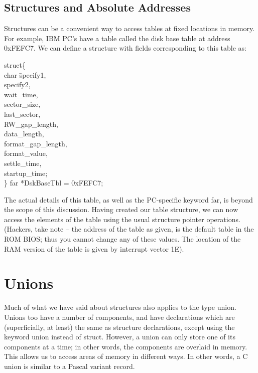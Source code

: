 \subsection{Structures and Absolute Addresses}
Structures can be a convenient way to access tables at fixed
locations in memory. For example, IBM PC's have a table called the
disk base table at address {\cd 0xFEFC7}. We can define a structure
with fields corresponding to this table as:
\begin{code}
struct\{ \+\\
	char \=specify1, \+\\
		specify2,	\\
		wait\_time,	\\
		sector\_size,	\\
		last\_sector,	\\
		RW\_gap\_length,	\\
		data\_length,	\\
		format\_gap\_length,	\\
		format\_value,	\\
		settle\_time,	\\
		startup\_time;	\-\-\\
\} far *DskBaseTbl = 0xFEFC7;
\end{code}
\noindent
The actual details of this table, as well as the PC-specific
keyword {\cd far}, is beyond the scope of this discussion. Having
created our table structure, we can now access the elements of the
table using the usual structure pointer operations. (Hackers, take
note -- the address of the table as given, is the default table in the
ROM BIOS; thus you cannot change any of these values. The location of
the RAM version of the table is given by interrupt vector 1E).

\section{Unions}
     Much of  what we  have said  about  structures  also applies
to the  type {\cd union}. Unions too have a number of components, and
have declarations which are (superficially, at least) the same as
structure declarations, except using the keyword {\cd union}  instead
of  {\cd struct}. However,  a union can only store one of its
components at  a time;  in other words, the components are overlaid in
memory.  This allows us to access areas of memory in different ways.
In other words, a C {\cd union} is similar to a Pascal variant
record.

